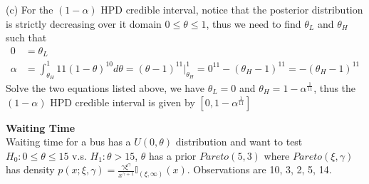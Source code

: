 \documentclass{homeworg}
\begin{document}
(c) For the $(1-\alpha)$ HPD credible interval, notice that the posterior distribution is strictly decreasing over it domain $0\leq \theta \leq 1$, thus we need to find $\theta_L$ and $\theta_H$ such that 
\begin{align*}
0&=\theta_L\\
\alpha&=\int_{\theta_H}^{1}11(1-\theta)^{10}d\theta=(\theta-1)^{11}|_{\theta_H}^1=0^{11}-(\theta_H-1)^{11}=-(\theta_H-1)^{11}
\end{align*}
Solve the two equations listed above, we have $\theta_L=0$ and $\theta_H=1-\alpha^{\frac{1}{11}}$, thus the $(1-\alpha)$ HPD credible interval is given by $[0,1-\alpha^{\frac{1}{11}}]$

\exercise 
\textbf{Waiting Time} \\
Waiting time for a bus has a $U(0,\theta)$ distribution and want to test $H_0: 0\leq\theta\leq 15$ v.s. $H_1: \theta>15$, $\theta$ has a prior $Pareto(5,3)$ where $Pareto(\xi,\gamma)$ has density $p(x;\xi,\gamma)=
\frac{\gamma\xi^\gamma}{x^{\gamma+1}}\mathbb{I}_{(\xi,\infty)}(x)$. Observations are 10, 3, 2, 5, 14. 
\end{document}

